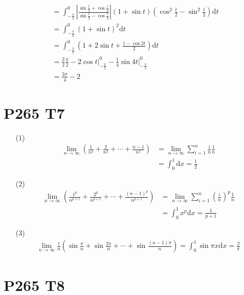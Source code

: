 \documentclass{article}
\newcommand{\dd}{\mathrm{d}}
\newcommand{\dx}{\dd x}
\newcommand{\dt}{\dd t}
\begin{document}
\begin{itemize}
\begin{align*}
        &= \int_{-\frac{\pi}{2}}^{0}\left\lvert \frac{\sin \frac{t}{2} + \cos \frac{t}{2}}{\sin \frac{t}{2} - \cos \frac{t}{2}}\right\rvert (1 + \sin t) \left(\cos^2 \frac{t}{2} - \sin^2 \frac{t}{2}\right) \dt \\
        &= \int_{-\frac{\pi}{2}}^{0}(1 + \sin t)^2 \dt \\
        &= \int_{-\frac{\pi}{2}}^{0}\left(1 + 2 \sin t + \frac{1 - \cos 2t}{2}\right)\dt \\
        &= \frac{3}{2}\frac{\pi}{2} - 2\cos t\bigg|_{-\frac{\pi}{2}}^{0} - \frac{1}{4}\sin 4t \bigg|_{-\frac{\pi}{2}}^{0} \\
        &= \frac{3\pi}{4} - 2
    \end{align*}
\end{itemize}

\section*{P265 T7}

\begin{itemize}
    \item [(1)] 
    \begin{align*}
        \lim_{n \to \infty}\left(\frac{1}{n^2} + \frac{2}{n^2} + \cdots + \frac{n - 1}{n^2}\right) &= \lim_{n \to \infty}\sum_{i = 1}^{n}\frac{i}{n}\frac{1}{n} \\
        &= \int_{0}^{1}\dx = \frac{1}{2}
    \end{align*}
    \item [(2)]
    \begin{align*}
        \lim_{n \to \infty}\left(\frac{1^p}{n^{p + 1}} + \frac{2^p}{n^{p + 1}} + \cdots + \frac{(n - 1)^p}{n^{p + 1}}\right) &= \lim_{n \to \infty}\sum_{i = 1}^{n}\left(\frac{i}{n}\right)^p\frac{1}{n}\\
        &= \int_{0}^{1}x^p \dx = \frac{1}{p + 1}
    \end{align*}
    \item [(3)]
    \begin{align*}
        \lim_{n \to \infty}\frac{1}{n}\left(\sin\frac{\pi}{n} + \sin \frac{2\pi}{n} + \cdots + \sin \frac{(n - 1)\pi}{n}\right) = \int_{0}^{1}\sin \pi x \dx = \frac{2}{\pi}
    \end{align*}
\end{itemize}

\section*{P265 T8}
\end{document}
